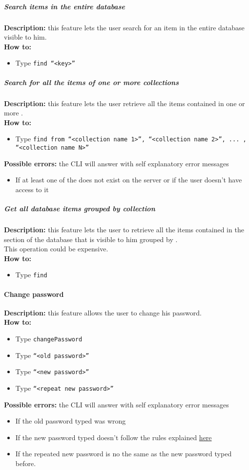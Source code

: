 \documentclass{scalatekids-article}
\begin{document}
\subparagraph{Search items in the entire database}
\textbf{Description:} this feature lets the user search for an item in the entire database visible to him.\\
\textbf{How to:}
\begin{itemize}
\item Type \texttt{find ``<key>''}
\end{itemize}

\subparagraph{Search for all the items of one or more collections}
\textbf{Description:} this feature lets the user retrieve all the items contained in one or more .\\
\textbf{How to:}
\begin{itemize}
\item Type \texttt{find from ``<collection name 1>'', ``<collection name 2>'', ... , ``<collection name N>''}
\end{itemize}
\textbf{Possible errors:} the CLI will answer with self explanatory error messages
\begin{itemize}
\item If at least one of the  does not exist on the server or if the user doesn't have access to it
\end{itemize}

\subparagraph{Get all database items grouped by collection}
\textbf{Description:} this feature lets the user to retrieve all the items contained in the section of the database that is visible to him grouped by .\\
This operation could be expensive.\\
\textbf{How to:}
\begin{itemize}
\item Type \texttt{find}
\end{itemize}

\paragraph{Change password}
\label{sec:changepassword}
\textbf{Description:} this feature allows the user to change his password.\\
\textbf{How to:}
\begin{itemize}
\item Type \texttt{changePassword}
\item Type \texttt{``<old password>''}
\item Type \texttt{``<new password>''}
\item Type \texttt{``<repeat new password>''}
\end{itemize}
\textbf{Possible errors:} the CLI will answer with self explanatory error messages
\begin{itemize}
\item If the old password typed was wrong
\item If the new password typed doesn't follow the rules explained \hyperref[sec:passwordrequirement]{here}
\item If the repeated new password is no the same as the new password typed before.
\end{itemize}
\end{document}
